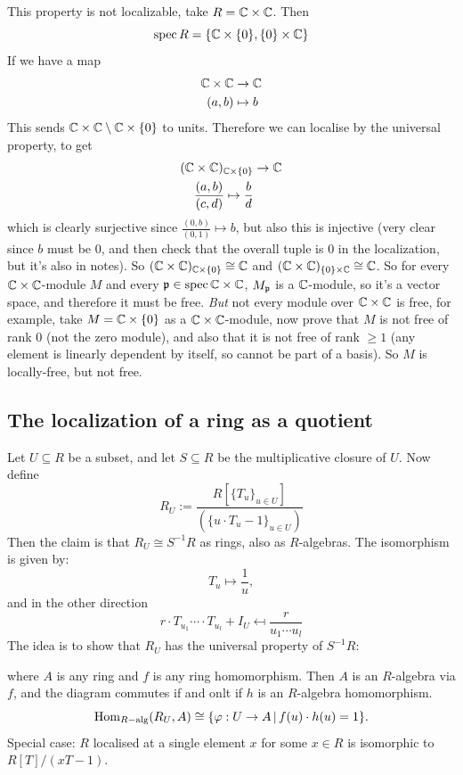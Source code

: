 \documentclass{article}
\begin{document}
\begin{ex}
This property is not localizable, take $R=\mathbb{C} \times \mathbb{C}$. Then \[ \operatorname{spec} R = \{\mathbb{C} \times \{0 \}, \{ 0 \} \times \mathbb{C} \}\]
If we have a map \begin{align*}
    \mathbb{C} \times \mathbb{C} &\to \mathbb{C}\\
    (a,b) &\mapsto b
\end{align*}
This sends $\mathbb{C} \times \mathbb{C} \setminus \mathbb{C} \times \{0\}$ to units. Therefore we can localise by the universal property, to get \begin{align*}
    (\mathbb{C} \times \mathbb{C})_{\mathbb{C} \times \{0\} } &\to \mathbb{C}\\
    \frac{(a,b)}{(c,d)} \mapsto \frac{b}{d}\\
\end{align*}
which is clearly surjective since $\frac{(0,b)}{(0,1)} \mapsto b$, but also this is injective (very clear since $b$ must be $0$, and then check that the overall tuple is $0$ in the localization, but it's also in notes).
So $(\mathbb{C} \times \mathbb{C})_{\mathbb{C} \times \{0\}} \cong \mathbb{C}$ and $(\mathbb{C} \times \mathbb{C})_{\{0\} \times \mathbb{C}} \cong \mathbb{C}$. So for every $\mathbb{C} \times \mathbb{C}$-module $M$ and every $\mathfrak{p} \in \operatorname{spec} \mathbb{C} \times \mathbb{C}$, $M_{\mathfrak{p}}$ is a $\mathbb{C}$-module, so it's a vector space, and therefore it must be free. 
\textit{But} not every module over $\mathbb{C} \times \mathbb{C}$ is free, for example, take $M=\mathbb{C} \times \{0\}$ as a $\mathbb{C} \times \mathbb{C}$-module, now prove that $M$ is not free of rank 0 (not the zero module), and also that it is not free of rank $\geq 1$ (any element is linearly dependent by itself, so cannot be part of a basis). So $M$ is locally-free, but not free.
\end{ex}
\subsection{The localization of a ring as a quotient}
Let $U \subseteq R$ be a subset, and let $S \subseteq R$ be the multiplicative closure of $U$. Now define \[ R_{U} := \frac{R[\{T_{u}\}_{u \in U} ]}{(\{u \cdot T_{u}-1\}_{u \in U})} \]
Then the claim is that $R_{U} \cong S^{-1}R$ as rings, also as $R$-algebras. The isomorphism is given by: \[ T_{u} \mapsto \frac{1}{u},\] and in the other direction \[ r \cdot T_{u_{1}} \cdots \cdot T_{u_{l}} + I_{U} \mapsfrom \frac{r}{u_{1} \cdots u_{l}}\]
\proof The idea is to show that $R_{U}$ has the universal property of $S^{-1}R$: \begin{center}
\end{center} 
where $A$ is any ring and $f$ is any ring homomorphism. Then $A$ is an $R$-algebra via $f$, and the diagram commutes if and onlt if $h$ is an $R$-algebra homomorphism. 
\[\operatorname{Hom}_{R-\text{alg}}(R_{U},A) \cong \{ \varphi : U \to A \, | \, f(u) \cdot h(u) =1 \}. \]
Special case: $R$ localised at a single element $x$ for some $x \in R$ is isomorphic to $R[T]/(xT-1)$.
\end{document}
